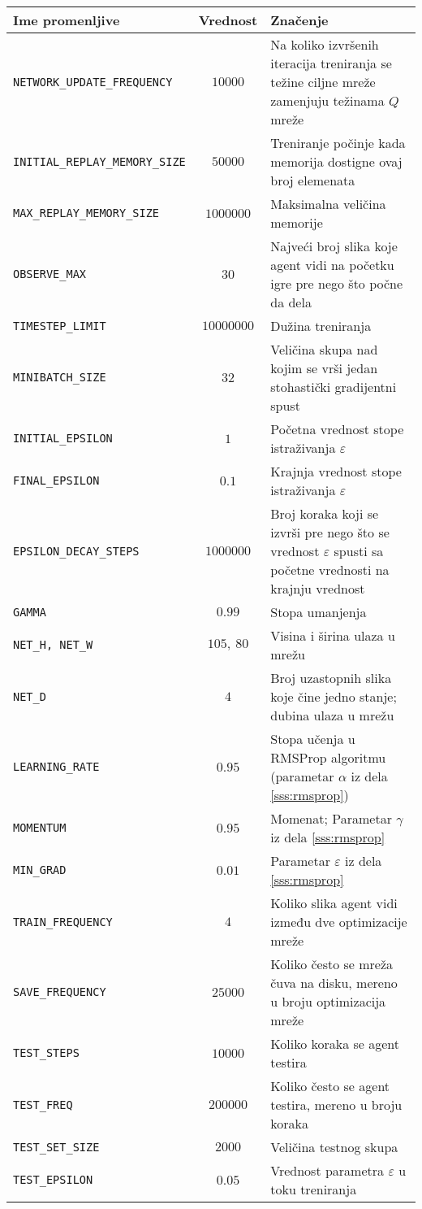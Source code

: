 \begin{table}
{\renewcommand{\arraystretch}{1.2}
 \begin{tabularx}{\textwidth}{|l|c|X|} 
 \hline
 Ime promenljive & Vrednost & Značenje \\ 
 \hline\hline
 \texttt{NETWORK\_UPDATE\_FREQUENCY} & $10000$ & Na koliko izvršenih iteracija treniranja se težine ciljne mreže zamenjuju težinama $Q$ mreže  \\ 
 \hline
 \texttt{INITIAL\_REPLAY\_MEMORY\_SIZE} & $50000$ & Treniranje počinje kada memorija dostigne ovaj broj elemenata\\
 \hline
 \texttt{MAX\_REPLAY\_MEMORY\_SIZE} & $1000000$ & Maksimalna veličina memorije  \\
 \hline
 \texttt{OBSERVE\_MAX} & $30$ & Najveći broj slika koje agent vidi na početku igre pre nego što počne da dela  \\
 \hline
 \texttt{TIMESTEP\_LIMIT} & $10000000$ & Dužina treniranja  \\
 \hline
 \texttt{MINIBATCH\_SIZE} & $32$ & Veličina skupa nad kojim se vrši jedan stohastički gradijentni spust  \\
 \hline
 \texttt{INITIAL\_EPSILON} & $1$ & Početna vrednost stope istraživanja $\varepsilon$  \\
 \hline
 \texttt{FINAL\_EPSILON} & $0.1$ & Krajnja vrednost stope istraživanja $\varepsilon$  \\
 \hline
 \texttt{EPSILON\_DECAY\_STEPS} & $1000000$ & Broj koraka koji se izvrši pre nego što se vrednost $\varepsilon$ spusti sa početne vrednosti na krajnju vrednost  \\
 \hline
 \texttt{GAMMA} & $0.99$ & Stopa umanjenja  \\
 \hline
 \texttt{NET\_H, NET\_W} & $105,~80$ & Visina i širina ulaza u mrežu  \\
 \hline
 \texttt{NET\_D} & $4$ & Broj uzastopnih slika koje čine jedno stanje; dubina ulaza u mrežu  \\
 \hline
 \texttt{LEARNING\_RATE} & $0.95$ & Stopa učenja u RMSProp algoritmu (parametar $\alpha$ iz dela \ref{sss:rmsprop})  \\
 \hline
 \texttt{MOMENTUM} & $0.95$ & Momenat; Parametar $\gamma$ iz dela \ref{sss:rmsprop}  \\
 \hline
 \texttt{MIN\_GRAD} & $0.01$ & Parametar $\varepsilon$ iz dela \ref{sss:rmsprop}  \\
 \hline
 \texttt{TRAIN\_FREQUENCY} & $4$ & Koliko slika agent vidi između dve optimizacije mreže  \\
 \hline
 \texttt{SAVE\_FREQUENCY} & $25000$ & Koliko često se mreža čuva na disku, mereno u broju optimizacija mreže  \\
 \hline
 \texttt{TEST\_STEPS} & $10000$ & Koliko koraka se agent testira  \\
 \hline
 \texttt{TEST\_FREQ} & $200000$ & Koliko često se agent testira, mereno u broju koraka  \\
 \hline
 \texttt{TEST\_SET\_SIZE} & $2000$ & Veličina testnog skupa  \\
 \hline
 \texttt{TEST\_EPSILON} & $0.05$ & Vrednost parametra $\varepsilon$ u toku treniranja  \\
 \hline


\end{tabularx}}
\end{table}
